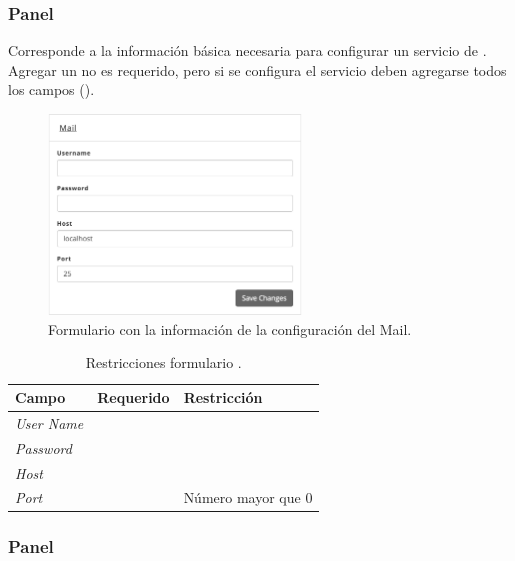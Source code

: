 \subsubsection*{Panel \mailPanel}

Corresponde a la información básica necesaria para configurar un servicio de \email. Agregar un \email no es requerido, pero si se configura el servicio deben agregarse todos los campos ().

\begin{figure}[H]
	\centering
	\includegraphics[width=0.6\textwidth]{figuras/dashboard/ecommerce/mail/menu.png}
	\caption{Formulario con la información de la configuración del Mail.}
	\label{figure:dashboard:ecommerce:mail:menu}
\end{figure}

\begin{table}[H]
    \centering
	\begin{tabular}{ |l|c||l| }
		\hline Campo & Requerido & Restricción \\ \hline
		\multirow{1}{*}{\textit{User Name}} &  {\checkmark} &  \\ \hline
		\multirow{1}{*}{\textit{Password}} 	&  {\checkmark} &  \\ \hline
		\multirow{1}{*}{\textit{Host}} 		&  {\checkmark} &  \\ \hline
		\multirow{1}{*}{\textit{Port}} 		&  {\checkmark} & Número mayor que 0 \\ \hline
		\hline
	\end{tabular}
 	\caption{Restricciones formulario \mailPanel.}
    \label{tab:dashboard:ecommerce:form:mail}
\end{table}


\subsubsection*{Panel \optionsPanel}

